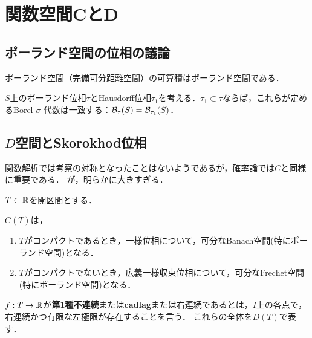 \documentclass[uplatex,dvipdfmx]{jsreport}
\begin{document}
\section{関数空間CとD}

\subsection{ポーランド空間の位相の議論}

\begin{lemma}
    ポーランド空間（完備可分距離空間）の可算積はポーランド空間である．
\end{lemma}

\begin{theorem}
    $S$上のポーランド位相$\tau$とHausdorff位相$\tau_1$を考える．$\tau_1\subset\tau$ならば，これらが定めるBorel $\sigma$-代数は一致する：$\mathcal{B}_\tau(S)=\mathcal{B}_{\tau_1}(S)$．
\end{theorem}

\subsection{$D$空間とSkorokhod位相}

\begin{tcolorbox}[colframe=ForestGreen, colback=ForestGreen!10!white,breakable,colbacktitle=ForestGreen!40!white,coltitle=black,fonttitle=\bfseries\sffamily,
title=]
    関数解析では考察の対称となったことはないようであるが，確率論では$C$と同様に重要である．
    が，明らかに大きすぎる．
\end{tcolorbox}

\begin{notation}
    $T\subset\mathbb{R}$を開区間とする．
\end{notation}

\begin{theorem}
    $C(T)$は，
    \begin{enumerate}
        \item $T$がコンパクトであるとき，一様位相について，可分なBanach空間(特にポーランド空間)となる．
        \item $T$がコンパクトでないとき，広義一様収束位相について，可分なFrechet空間(特にポーランド空間)となる．
    \end{enumerate}
\end{theorem}

\begin{definition}
    $f:T\to\mathbb{R}$が\textbf{第1種不連続}または\textbf{cadlag}または右連続であるとは，$I$上の各点で，右連続かつ有限な左極限が存在することを言う．
    これらの全体を$D(T)$で表す．
\end{definition}
\end{document}
